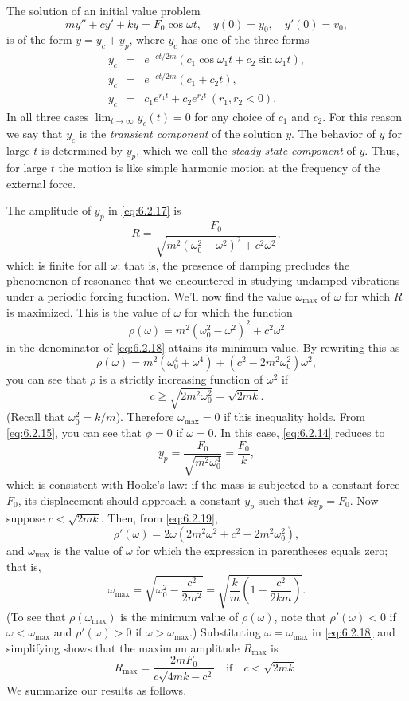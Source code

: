\documentclass{ximera}
\begin{document}
The solution of an initial value problem
$$
my''+cy'+ky=F_0\cos\omega t, \quad  y(0)=y_0,\quad y'(0)=v_0,
$$
is of the form $y=y_c+y_p$,
where  $y_c$ has one of the three forms
\begin{eqnarray*}
y_c&=&e^{-ct/2m}(c_1\cos\omega_1t+c_2\sin\omega_1t),\\
 y_c&=&e^{-ct/2m}(c_1+c_2t),\\
y_c&=&c_1e^{r_1t}+c_2e^{r_2t}\,(r_1,r_2<0).
\end{eqnarray*}
In all three cases $\lim_{t\rightarrow\infty} y_c(t)=0$ for any choice of
$c_1$ and $c_2$. For this reason we say that $y_c$ is the \textit{transient component} of the solution $y$. The behavior of $y$ for
large $t$ is determined by $y_p$, which we call the \textit{steady state
component} of $y$. Thus, for large $t$ the motion is like simple
harmonic motion at the frequency of the external force.
 
The amplitude of $y_p$ in \eqref{eq:6.2.17} is
\begin{equation}\label{eq:6.2.18}
R=\frac{F_0}{\sqrt{m^2(\omega^2_0-\omega^2)^2+c^2\omega^2}},
\end{equation}
which is finite for all $\omega$; that is, the presence of damping
precludes the phenomenon of resonance that we encountered in studying
undamped vibrations under a periodic forcing function. We'll now
find the value $\omega_{\max}$ of $\omega$ for which $R$ is maximized.
This is the value of $\omega$ for which the function
$$
\rho (\omega)=m^2(\omega^2_0-\omega^2)^2+c^2\omega^2
$$
in the denominator of  \eqref{eq:6.2.18} attains its minimum value.  By
rewriting this as
\begin{equation}\label{eq:6.2.19}
\rho (\omega)=m^2(\omega^4_0+\omega^4)+
 (c^2-2m^2\omega^2_0)\omega^2,
\end{equation}
 you can see that $\rho$ is a strictly
increasing function of $\omega^2$ if
$$
c\geq\sqrt{2m^2\omega^2_0}=\sqrt{2mk}.
$$
(Recall that $\omega^2_0=k/m$). Therefore $\omega_{\max}=0$ if this
inequality holds. From \eqref{eq:6.2.15}, you can see that $\phi=0$ if
$\omega=0$. In this case, \eqref{eq:6.2.14} reduces to
$$
y_p=\frac{F_0}{\sqrt{m^2\omega^4_0}}=\frac{F_0}{k},
$$
which is consistent with Hooke's law: if the mass is subjected to a
constant force $F_0$,  its displacement should approach a constant
$y_p$ such that $ky_p=F_0$. Now suppose   $c<\sqrt{2mk}$. Then,
from \eqref{eq:6.2.19},
$$
\rho'(\omega)=2\omega(2m^2\omega^2+c^2-2m^2\omega^2_0),
$$
and $\omega_{\max}$ is the value of $\omega$ for which the
expression in parentheses equals zero; that is,
$$
\omega_{\max}=\sqrt{\omega^2_0-\frac{c^2}{2m^2}}
=\sqrt{\frac{k}{m}\left(1-\frac{c^2}{2km}\right)}.
$$
(To see that $\rho(\omega_{\max})$ is the minimum value of
$\rho(\omega)$, note that $\rho'(\omega)<0$ if $\omega
<\omega_{\max}$ and $\rho'(\omega)>0$ if $\omega>\omega_{\max}$.)
Substituting $\omega=\omega_{\max}$ in \eqref{eq:6.2.18} and simplifying
shows that the maximum amplitude $R_{\max}$ is
$$
R_{\max}=\frac{2mF_0}{c\sqrt{4mk-c^2}}\quad \mbox{if}\quad c<
\sqrt{2mk}.
$$
We summarize our results  as follows.
 
\end{document}
